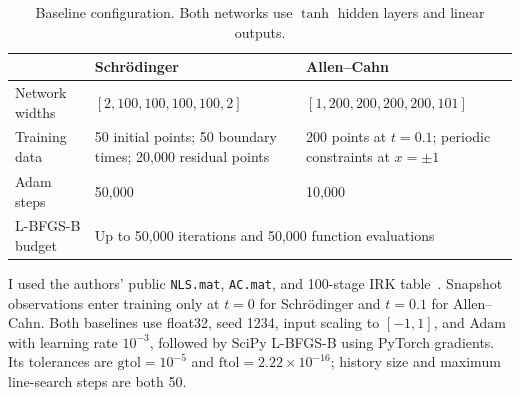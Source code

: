 \documentclass[11pt,letterpaper]{article}
\begin{document}
\begin{table}[H]\centering\small
\caption{Baseline configuration. Both networks use $\tanh$ hidden layers and linear outputs.}
\begin{tabularx}{\linewidth}{@{}lXX@{}}\toprule
 & Schr\"odinger & Allen--Cahn \\\midrule
Network widths & $[2,100,100,100,100,2]$ & $[1,200,200,200,200,101]$ \\
Training data & 50 initial points; 50 boundary times; 20,000 residual points & 200 points at $t=0.1$; periodic constraints at $x=\pm1$ \\
Adam steps & 50,000 & 10,000 \\
L-BFGS-B budget & \multicolumn{2}{l}{Up to 50,000 iterations and 50,000 function evaluations} \\\bottomrule
\end{tabularx}
\end{table}
I used the authors' public \texttt{NLS.mat}, \texttt{AC.mat}, and 100-stage IRK table~\cite{code}. Snapshot observations enter training only at $t=0$ for Schr\"odinger and $t=0.1$ for Allen--Cahn. Both baselines use float32, seed 1234, input scaling to $[-1,1]$, and Adam with learning rate $10^{-3}$, followed by SciPy L-BFGS-B using PyTorch gradients. Its tolerances are $\mathrm{gtol}=10^{-5}$ and $\mathrm{ftol}=2.22\times10^{-16}$; history size and maximum line-search steps are both 50.

\clearpage
\end{document}
